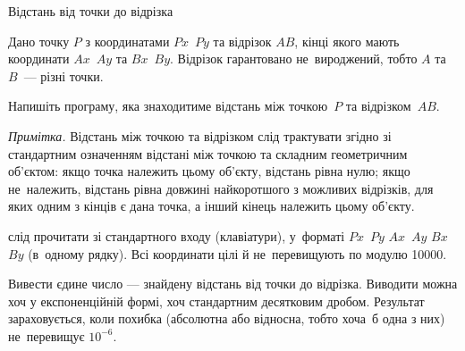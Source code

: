 ﻿\begin{problemAllDefault}{Відстань від точки до відрізка}

Дано точку $P$ з координатами $Px$~$Py$ та відрізок $AB$, кінці якого мають координати $Ax$~$Ay$ та $Bx$~$By$. Відрізок гарантовано не~вироджений, тобто $A$ та~$B$~--- різні точки.

Напишіть програму, яка знаходитиме відстань між точкою~$P$ та відрізком~$AB$.

\emph{Примітка.} Відстань між точкою та відрізком слід трактувати згідно зі стандартним означенням відстані між точкою та складним геометричним об'єктом: якщо точка належить цьому об'єкту, відстань рівна нулю; якщо не~належить, відстань рівна довжині найкоротшого з можливих відрізків, для яких одним з кінців є дана точка, а інший кінець належить цьому об'єкту.

\InputFile слід прочитати зі стандартного входу (клавіатури), у~форматі $Px$~$Py$ $Ax$~$Ay$ $Bx$~$By$ (в~одному рядку). Всі координати цілі й не~перевищують по модулю 10000.

\OutputFile Вивести єдине число --- знайдену відстань від точки до відрізка. Виводити можна хоч у експоненційній формі, хоч стандартним десятковим дробом. Результат зараховується, коли похибка (абсолютна або відносна, тобто хоча~б одна з них) не~перевищує $10^{-6}$.

\Example

\begin{example}
\end{example}

\end{problemAllDefault}
